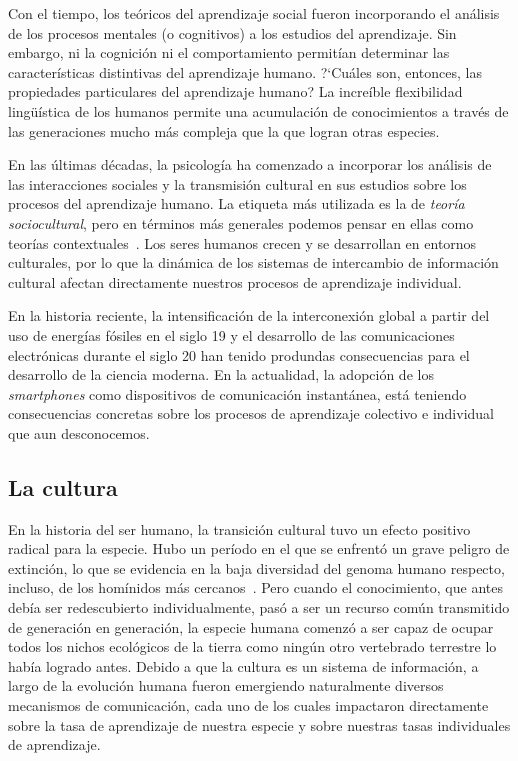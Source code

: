 \documentclass[a4paper,11pt]{book}
\theoremstyle{definition}
\begin{document}

Con el tiempo, los te\'oricos del aprendizaje social fueron incorporando el an\'alisis de los procesos mentales (o cognitivos) a los estudios del aprendizaje.
%
Sin embargo, ni la cognici\'on ni el comportamiento permit\'ian determinar las caracter\'isticas distintivas del aprendizaje humano.
%
?`Cu\'ales son, entonces, las propiedades particulares del aprendizaje humano?
%
La incre\'ible flexibilidad lingü\'istica de los humanos permite una acumulaci\'on de conocimientos a trav\'es de las generaciones mucho m\'as compleja que la que logran otras especies.


En las \'ultimas d\'ecadas, la psicolog\'ia ha comenzado a incorporar los an\'alisis de las interacciones sociales y la transmisi\'on cultural en sus estudios sobre los procesos del aprendizaje humano.
%
La etiqueta m\'as utilizada es la de \emph{teor\'ia sociocultural}, pero en t\'erminos m\'as generales podemos pensar en ellas como teor\'ias contextuales~\cite{Ormrod2017}.
%
Los seres humanos crecen y se desarrollan en entornos culturales, por lo que la din\'amica de los sistemas de intercambio de informaci\'on cultural afectan directamente nuestros procesos de aprendizaje individual.


En la historia reciente, la intensificaci\'on de la interconexi\'on global a partir del uso de energ\'ias f\'osiles en el siglo 19 y el desarrollo de las comunicaciones electr\'onicas durante el siglo 20 han tenido produndas consecuencias para el desarrollo de la ciencia moderna.
%
En la actualidad, la adopci\'on de los \emph{smartphones} como dispositivos de comunicaci\'on instant\'anea, est\'a teniendo consecuencias concretas sobre los procesos de aprendizaje colectivo e individual que aun desconocemos.

\subsection{La cultura}

En la historia del ser humano, la transici\'on cultural tuvo un efecto positivo radical para la especie.
%
Hubo un per\'iodo en el que se enfrent\'o un grave peligro de extinci\'on, lo que se evidencia en la baja diversidad del genoma humano respecto, incluso, de los hom\'inidos m\'as cercanos~\cite{Hrdy2009}.
%
Pero cuando el conocimiento, que antes deb\'ia ser redescubierto individualmente, pas\'o a ser un recurso com\'un transmitido de generaci\'on en generaci\'on, la especie humana comenz\'o a ser capaz de ocupar todos los nichos ecol\'ogicos de la tierra como ning\'un otro vertebrado terrestre lo hab\'ia logrado antes.
%
Debido a que la cultura es un sistema de informaci\'on, a largo de la evoluci\'on humana fueron emergiendo naturalmente diversos mecanismos de comunicaci\'on, cada uno de los cuales impactaron directamente sobre la tasa de aprendizaje de nuestra especie y sobre nuestras tasas individuales de aprendizaje.
\end{document}
